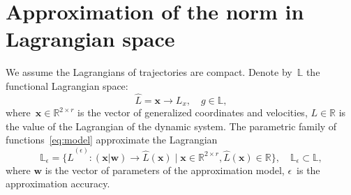 \documentclass[sn-mathphys-num]{sn-jnl}
\theoremstyle{thmstylethree}
\theoremstyle{thmstyletwo}
\theoremstyle{thmstyleone}
\begin{document}
\section{Approximation of the norm in Lagrangian space}
We assume the Lagrangians of trajectories are compact. 
Denote by~$\mathbb{L}$ the functional Lagrangian space:
\[ 
\hat{L} =  \mathbf{x} \to L_x, \quad g \in \mathbb{L},
\] 
where~$\mathbf{x} \in \mathbb{R}^{2 \times r}$ is the vector of generalized coordinates and velocities, $L \in \mathbb{R}$ is the value of the Lagrangian of the dynamic system. The parametric family of functions~\eqref{eq:model} approximate the Lagrangian
\[
 \mathbb{L}_{\epsilon} = \{ \hat{L}^{(\epsilon)} \colon (\mathbf{x} | \mathbf{w}) \to \hat{L}(\mathbf{x}) \mid \mathbf{x} \in \mathbb{R}^{2 \times r}, \hat{L}(\mathbf{x})  \in \mathbb{R}\}, \quad \mathbb{L}_{\epsilon} \subset \mathbb{L},
\]
where $\mathbf{w}$ is the vector of parameters of the approximation model, $\epsilon$~is the approximation accuracy.
\end{document}
